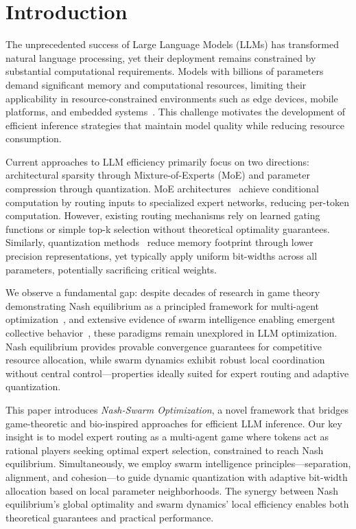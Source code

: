 \documentclass[11pt]{article}
\begin{document}
\section{Introduction}
\label{sec:introduction}

The unprecedented success of Large Language Models (LLMs) has transformed natural language processing, yet their deployment remains constrained by substantial computational requirements. Models with billions of parameters demand significant memory and computational resources, limiting their applicability in resource-constrained environments such as edge devices, mobile platforms, and embedded systems~\cite{vaswani2017attention}. This challenge motivates the development of efficient inference strategies that maintain model quality while reducing resource consumption.

Current approaches to LLM efficiency primarily focus on two directions: architectural sparsity through Mixture-of-Experts (MoE) and parameter compression through quantization. MoE architectures~\cite{fedus2021switch,zoph2022designing} achieve conditional computation by routing inputs to specialized expert networks, reducing per-token computation. However, existing routing mechanisms rely on learned gating functions or simple top-k selection without theoretical optimality guarantees. Similarly, quantization methods~\cite{frantar2023gptq,dettmers2022llm,lin2023awq} reduce memory footprint through lower precision representations, yet typically apply uniform bit-widths across all parameters, potentially sacrificing critical weights.

We observe a fundamental gap: despite decades of research in game theory demonstrating Nash equilibrium as a principled framework for multi-agent optimization~\cite{nash1950equilibrium}, and extensive evidence of swarm intelligence enabling emergent collective behavior~\cite{reynolds1987flocks,ballerini2008interaction}, these paradigms remain unexplored in LLM optimization. Nash equilibrium provides provable convergence guarantees for competitive resource allocation, while swarm dynamics exhibit robust local coordination without central control---properties ideally suited for expert routing and adaptive quantization.

This paper introduces \textit{Nash-Swarm Optimization}, a novel framework that bridges game-theoretic and bio-inspired approaches for efficient LLM inference. Our key insight is to model expert routing as a multi-agent game where tokens act as rational players seeking optimal expert selection, constrained to reach Nash equilibrium. Simultaneously, we employ swarm intelligence principles---separation, alignment, and cohesion---to guide dynamic quantization with adaptive bit-width allocation based on local parameter neighborhoods. The synergy between Nash equilibrium's global optimality and swarm dynamics' local efficiency enables both theoretical guarantees and practical performance.
\end{document}
